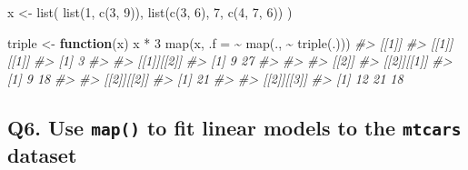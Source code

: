 \documentclass[
]{book}
\newenvironment{Shaded}{\begin{snugshade}}{\end{snugshade}}
\newcommand{\AttributeTok}[1]{\textcolor[rgb]{0.77,0.63,0.00}{#1}}
\newcommand{\CommentTok}[1]{\textcolor[rgb]{0.56,0.35,0.01}{\textit{#1}}}
\newcommand{\ControlFlowTok}[1]{\textcolor[rgb]{0.13,0.29,0.53}{\textbf{#1}}}
\newcommand{\DecValTok}[1]{\textcolor[rgb]{0.00,0.00,0.81}{#1}}
\newcommand{\FunctionTok}[1]{\textcolor[rgb]{0.00,0.00,0.00}{#1}}
\newcommand{\NormalTok}[1]{#1}
\newcommand{\OtherTok}[1]{\textcolor[rgb]{0.56,0.35,0.01}{#1}}
\newcommand{\SpecialCharTok}[1]{\textcolor[rgb]{0.00,0.00,0.00}{#1}}
\begin{document}
\begin{Shaded}
\begin{Highlighting}[]
\NormalTok{x }\OtherTok{\textless{}{-}} \FunctionTok{list}\NormalTok{(}
  \FunctionTok{list}\NormalTok{(}\DecValTok{1}\NormalTok{, }\FunctionTok{c}\NormalTok{(}\DecValTok{3}\NormalTok{, }\DecValTok{9}\NormalTok{)),}
  \FunctionTok{list}\NormalTok{(}\FunctionTok{c}\NormalTok{(}\DecValTok{3}\NormalTok{, }\DecValTok{6}\NormalTok{), }\DecValTok{7}\NormalTok{, }\FunctionTok{c}\NormalTok{(}\DecValTok{4}\NormalTok{, }\DecValTok{7}\NormalTok{, }\DecValTok{6}\NormalTok{))}
\NormalTok{)}

\NormalTok{triple }\OtherTok{\textless{}{-}} \ControlFlowTok{function}\NormalTok{(x) x }\SpecialCharTok{*} \DecValTok{3}
\FunctionTok{map}\NormalTok{(x, }\AttributeTok{.f =} \SpecialCharTok{\textasciitilde{}} \FunctionTok{map}\NormalTok{(., }\SpecialCharTok{\textasciitilde{}} \FunctionTok{triple}\NormalTok{(.)))}
\CommentTok{\#\textgreater{} [[1]]}
\CommentTok{\#\textgreater{} [[1]][[1]]}
\CommentTok{\#\textgreater{} [1] 3}
\CommentTok{\#\textgreater{} }
\CommentTok{\#\textgreater{} [[1]][[2]]}
\CommentTok{\#\textgreater{} [1]  9 27}
\CommentTok{\#\textgreater{} }
\CommentTok{\#\textgreater{} }
\CommentTok{\#\textgreater{} [[2]]}
\CommentTok{\#\textgreater{} [[2]][[1]]}
\CommentTok{\#\textgreater{} [1]  9 18}
\CommentTok{\#\textgreater{} }
\CommentTok{\#\textgreater{} [[2]][[2]]}
\CommentTok{\#\textgreater{} [1] 21}
\CommentTok{\#\textgreater{} }
\CommentTok{\#\textgreater{} [[2]][[3]]}
\CommentTok{\#\textgreater{} [1] 12 21 18}
\end{Highlighting}
\end{Shaded}

\hypertarget{q6.-use-map-to-fit-linear-models-to-the-mtcars-dataset}{%
\subsection*{\texorpdfstring{Q6. Use \texttt{map()} to fit linear models to the \texttt{mtcars} dataset}{Q6. Use map() to fit linear models to the mtcars dataset}}\label{q6.-use-map-to-fit-linear-models-to-the-mtcars-dataset}}
\end{document}
